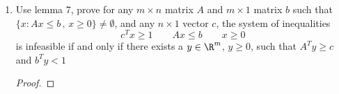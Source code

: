 \documentclass[11pt]{article}
\begin{document}
\begin{enumerate}
\begin{proof}
\begin{enumerate}
\[\begin{pmatrix}
                    -A & -I \\ 
                \end{pmatrix}  
                \qquad 
                \underset{m\times 1}{\tilde{b}} = 
                \begin{pmatrix}
                    -b
                \end{pmatrix}  
            \]
            Therefore, $(\textbf{7.2})$ can be rewritten as,
            \[
                \nexists y\in \R^m  \, ,\, y\geq 0 \quad A^T y\geq 0 \quad b^T y < 0
                \qquad \rightarrow \qquad 
                \nexists y\in \R^m  \, ,\, \tilde{A}^T y \leq 0 \quad \tilde{b}^T y > 0
            \]
            where the latter formulation is simply saying $(\textbf{5.2})$ is false, therefore $(\textbf{5.1})$ is true, i.e. 
            \[
                \exists \tilde{x} \in\R^{m+n} \, ,\, \tilde{x} \geq 0 \quad \tilde{A}\tilde{x} = \tilde{b} 
            \]
            let $\tilde{x} = (x,x')$ where $x\in\R^n, x'\in\R^m$, note $x,x'\geq 0$, also 
            \[
                \begin{pmatrix}
                    -A & -I \\ 
                \end{pmatrix}  
                \begin{pmatrix}
                    x \\ x' \\
                \end{pmatrix}
                = 
                \begin{pmatrix}
                    -b
                \end{pmatrix}  
                \qquad \iff \qquad 
                -Ax - x' = -b 
            \]
            therefore $Ax = b-x' \leq b$ since $x' \geq 0$, therefore,
            \[
                \exists x\in\R^n \, ,\, x\geq 0 \quad Ax \leq b
            \]
            hence $(\textbf{7.1})$ is true. 
        \end{enumerate}
    \end{proof}
    \item Use lemma 7, prove for any $m\times n$  matrix $A$ and $m\times 1$ matrix $b$ such that $\{x: Ax \leq b\, ,\, x\geq 0\} \neq \emptyset$, and any $n\times 1$ vector $c$, the system of inequalities 
    \[
        c^T x \geq 1 \qquad Ax \leq b \qquad x \geq 0     
    \]
    is infeasible if and only if there exists a $y\in\R^m$, $y\geq 0$, such that $A^T y\geq c$ and $b^T y < 1$
    \begin{proof}

\end{proof}
\end{enumerate}
\end{document}

